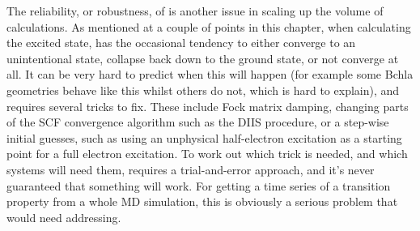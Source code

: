 The reliability, or robustness, of \dscf is another issue in scaling up the volume
of calculations. As mentioned at a couple of points in this chapter, when calculating
the excited state, \dscf has the occasional tendency to either converge to an
unintentional state, collapse back down to the ground state, or not converge at all.
It can be very hard to predict when this will happen (for example some Bchla 
geometries behave like this whilst others do not, which is hard to explain), and
requires several tricks to fix. These include Fock matrix damping, changing parts of
the SCF convergence algorithm such as the DIIS procedure, or a step-wise
initial guesses, such as using an unphysical half-electron excitation as a starting
point for a full electron excitation. To work out which trick is needed, and which
systems will need them, requires a trial-and-error approach, and it's never guaranteed
that something will work. For getting a time series of a transition property from
a whole MD simulation, this is obviously a serious problem that would need addressing.

